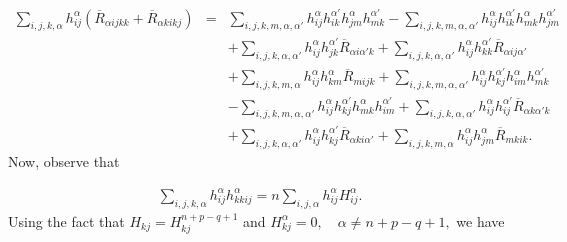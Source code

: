 \documentclass[leqno,11pt]{amsart}
\theoremstyle{plain}
\theoremstyle{definition}
\numberwithin{equation}{section}
\begin{document}
\begin{eqnarray*}
\sum_{i,j,k,\alpha}h_{ij}^{\alpha}
   (\overline{R}_{\alpha ijkk}+\overline{R}_{\alpha kikj})
&=& \sum_{i,j,k,m,\alpha,\alpha'}h_{ij}^{\alpha}h_{ik}^{\alpha'}h_{jm}^{\alpha}h_{mk}^{\alpha'}
   - \sum_{i,j,k,m,\alpha,\alpha'}h_{ij}^{\alpha}h_{ik}^{\alpha'}h_{mk}^{\alpha}h_{jm}^{\alpha'} \\[0.3em]
&&+ \sum_{i,j,k,\alpha,\alpha'}h_{ij}^{\alpha}h_{jk}^{\alpha'}\overline{R}_{\alpha i\alpha' k}
   + \sum_{i,j,k,\alpha,\alpha'}h_{ij}^{\alpha}h_{kk}^{\alpha'}\overline{R}_{\alpha ij \alpha'} \\[0.3em]
&&+ \sum_{i,j,k,m,\alpha}h_{ij}^{\alpha}h_{km}^{\alpha}\overline{R}_{mijk}
   + \sum_{i,j,k,m,\alpha,\alpha'}h_{ij}^{\alpha}h_{kj}^{\alpha'}h_{im}^{\alpha}h_{mk}^{\alpha'} \\[0.3em]
&&- \sum_{i,j,k,m,\alpha,\alpha'}h_{ij}^{\alpha}h_{kj}^{\alpha'}h_{mk}^{\alpha}h_{im}^{\alpha'}
   + \sum_{i,j,k,\alpha,\alpha'}h_{ij}^{\alpha}h_{ij}^{\alpha'}\overline{R}_{\alpha k\alpha' k} \\[0.3em]
&&+ \sum_{i,j,k,\alpha,\alpha'}h_{ij}^{\alpha}h_{kj}^{\alpha'}\overline{R}_{\alpha ki \alpha'}
   + \sum_{i,j,k,m,\alpha}h_{ij}^{\alpha}h_{jm}^{\alpha}\overline{R}_{mkik}.
\end{eqnarray*}
Now, observe that

\begin{eqnarray*}
\sum_{i,j,k,\alpha}h_{ij}^{\alpha}h_{kkij}^{\alpha}=n\sum_{i,j,\alpha}h_{ij}^{\alpha}H_{ij}^{\alpha}.
\end{eqnarray*}
Using the fact that $H_{kj}=H_{kj}^{n+p-q+1}$ and $H_{kj}^{\alpha}=0,\quad \alpha \neq n+p-q+1,$ we have
\end{document}
